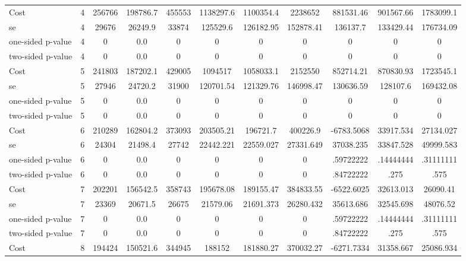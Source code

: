 \begin{tabular}{lcccccccccc}
Cost 			  &         4 &    256766 &  198786.7 &    455553 & 1138297.6 & 1100354.4 & 2238652 & 881531.46 & 901567.66 & 1783099.1 \\  
se 				  &         4 &     29676 &   26249.9 &     33874 & 125529.6 & 126182.95 & 152878.41 & 136137.7 & 133429.44 & 176734.09 \\  
one-sided p-value &         4 &         0 &       0.0 &         0 & 0 & 0 & 0 & 0 & 0 & 0 \\  
two-sided p-value &         4 &         0 &       0.0 &         0 & 0 & 0 & 0 & 0 & 0 & 0 \\  
Cost 			  &         5 &    241803 &  187202.1 &    429005 & 1094517 & 1058033.1 & 2152550 & 852714.21 & 870830.93 & 1723545.1 \\  
se 				  &         5 &     27946 &   24720.2 &     31900 & 120701.54 & 121329.76 & 146998.47 & 130636.59 & 128107.6 & 169432.08 \\  
one-sided p-value &         5 &         0 &       0.0 &         0 & 0 & 0 & 0 & 0 & 0 & 0 \\  
two-sided p-value &         5 &         0 &       0.0 &         0 & 0 & 0 & 0 & 0 & 0 & 0 \\  
Cost 			  &         6 &    210289 &  162804.2 &    373093 & 203505.21 & 196721.7 & 400226.9 & -6783.5068 & 33917.534 & 27134.027 \\  
se 				  &         6 &     24304 &   21498.4 &     27742 & 22442.221 & 22559.027 & 27331.649 & 37038.235 & 33847.528 & 49999.583 \\  
one-sided p-value &         6 &         0 &       0.0 &         0 & 0 & 0 & 0 & .59722222 & .14444444 & .31111111 \\  
two-sided p-value &         6 &         0 &       0.0 &         0 & 0 & 0 & 0 & .84722222 & .275 & .575 \\  
Cost 			  &         7 &    202201 &  156542.5 &    358743 & 195678.08 & 189155.47 & 384833.55 & -6522.6025 & 32613.013 & 26090.41 \\  
se 				  &         7 &     23369 &   20671.5 &     26675 & 21579.06 & 21691.373 & 26280.432 & 35613.686 & 32545.698 & 48076.52 \\  
one-sided p-value &         7 &         0 &       0.0 &         0 & 0 & 0 & 0 & .59722222 & .14444444 & .31111111 \\  
two-sided p-value &         7 &         0 &       0.0 &         0 & 0 & 0 & 0 & .84722222 & .275 & .575 \\  
Cost 			  &         8 &    194424 &  150521.6 &    344945 & 188152 & 181880.27 & 370032.27 & -6271.7334 & 31358.667 & 25086.934 \\  

\end{tabular}
